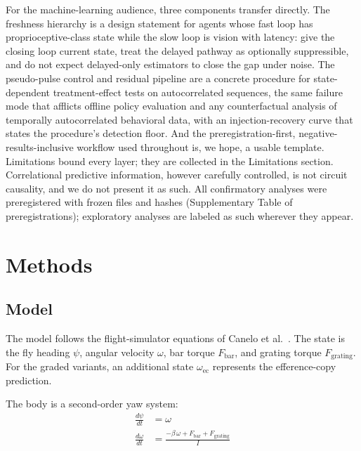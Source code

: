 \documentclass[pdflatex,sn-nature]{sn-jnl}
\begin{document}
For the machine-learning audience, three components transfer directly. The freshness hierarchy is a design statement for agents whose fast loop has proprioceptive-class state while the slow loop is vision with latency: give the closing loop current state, treat the delayed pathway as optionally suppressible, and do not expect delayed-only estimators to close the gap under noise. The pseudo-pulse control and residual pipeline are a concrete procedure for state-dependent treatment-effect tests on autocorrelated sequences, the same failure mode that afflicts offline policy evaluation and any counterfactual analysis of temporally autocorrelated behavioral data, with an injection-recovery curve that states the procedure's detection floor. And the preregistration-first, negative-results-inclusive workflow used throughout is, we hope, a usable template. Limitations bound every layer; they are collected in the Limitations section. Correlational predictive information, however carefully controlled, is not circuit causality, and we do not present it as such. All confirmatory analyses were preregistered with frozen files and hashes (Supplementary Table of preregistrations); exploratory analyses are labeled as such wherever they appear.

\section{Methods}\label{sec:methods}

\subsection{Model}

The model follows the flight-simulator equations of Canelo et al.\ \cite{canelo2024efference}. The state is the fly heading $\psi$, angular velocity $\omega$, bar torque $F_{\mathrm{bar}}$, and grating torque $F_{\mathrm{grating}}$. For the graded variants, an additional state $\omega_{\mathrm{ec}}$ represents the efference-copy prediction.

The body is a second-order yaw system:
\begin{align}
\frac{d\psi}{dt} &= \omega \\
\frac{d\omega}{dt} &= \frac{-\beta\,\omega + F_{\mathrm{bar}} + F_{\mathrm{grating}}}{I}
\end{align}
\end{document}
